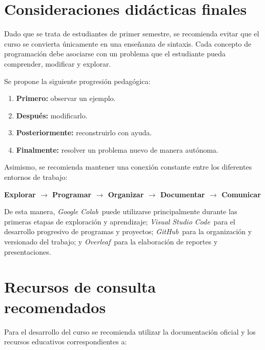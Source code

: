 \documentclass[12pt,letterpaper]{article}
\newcommand{\colab}{\textit{Google Colab}}
\newcommand{\vscode}{\textit{Visual Studio Code}}
\newcommand{\github}{\textit{GitHub}}
\newcommand{\overleaf}{\textit{Overleaf}}
\begin{document}
\section{Consideraciones didácticas finales}

Dado que se trata de estudiantes de primer semestre, se recomienda
evitar que el curso se convierta únicamente en una enseñanza de sintaxis.
Cada concepto de programación debe asociarse con un problema que el
estudiante pueda comprender, modificar y explorar.

Se propone la siguiente progresión pedagógica:

\begin{enumerate}[noitemsep]
    \item \textbf{Primero:} observar un ejemplo.
    \item \textbf{Después:} modificarlo.
    \item \textbf{Posteriormente:} reconstruirlo con ayuda.
    \item \textbf{Finalmente:} resolver un problema nuevo de manera
    autónoma.
\end{enumerate}

Asimismo, se recomienda mantener una conexión constante entre los
diferentes entornos de trabajo:

\begin{center}
\textbf{Explorar $\rightarrow$ Programar $\rightarrow$ Organizar
$\rightarrow$ Documentar $\rightarrow$ Comunicar}
\end{center}

De esta manera, \colab\ puede utilizarse principalmente durante las
primeras etapas de exploración y aprendizaje; \vscode\ para el
desarrollo progresivo de programas y proyectos; \github\ para la
organización y versionado del trabajo; y \overleaf\ para la elaboración
de reportes y presentaciones.\\[3ex]


\section{Recursos de consulta recomendados}

Para el desarrollo del curso se recomienda utilizar la documentación
oficial y los recursos educativos correspondientes a:
\end{document}
